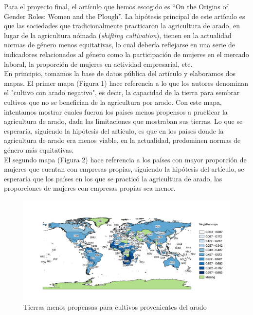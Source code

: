 \documentclass[11pt,a4paper]{article}
\begin{document}
Para el proyecto final, el artículo que hemos escogido es “On the Origins of Gender Roles: Women and the Plough”. La hipótesis principal de este artículo es que las sociedades que tradicionalmente practicaron la agricultura de arado, en lugar de la agricultura nómada (\textit{shifting cultivation}), tienen en la actualidad normas de género menos equitativas, lo cual debería reflejarse en una serie de indicadores relacionados al género como la participación de mujeres en el mercado laboral, la proporción de mujeres en actividad empresarial, etc.
\\
En principio, tomamos la base de datos pública del artículo y elaboramos dos mapas. El primer mapa (Figura 1) hace referencia a lo que los autores denominan el "cultivo con arado negativo", es decir, la capacidad de la tierra para sembrar cultivos que no se benefician de la agricultura por arado. Con este mapa, intentamos mostrar cuales fueron los paises menos propensos a practicar la agricultura de arado, dada las limitaciones que mostraban sus tierras. Lo que se esperaría, siguiendo la hipótesis del artículo, es que en los países donde la agricultura de arado era menos viable, en la actualidad, predominen normas de género más equitativas. 
\\
El segundo mapa (Figura 2) hace referencia a los países con mayor proporción de mujeres que cuentan con empresas propias, siguiendo la hipótesis del artículo, se esperaría que los países en los que se practicó la agricultura de arado, las proporciones de mujeres con empresas propias sea menor. 
\\
\begin{figure}[!h]
    \centering
    \includegraphics[width=15cm]{Graph/Graph 1.png}
   \caption{Tierras menos propensas para cultivos provenientes del arado}
    \label{fig:my_label}
\end{figure}
\end{document}
